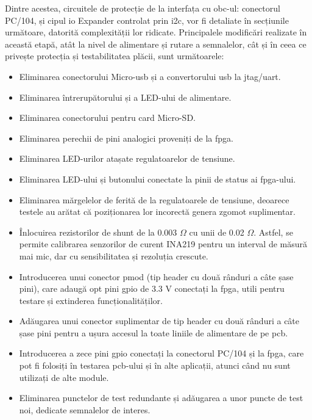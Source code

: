 \documentclass[12pt,a4paper]{report}
\begin{document}
Dintre acestea, circuitele de protecție de la interfața cu \gls{obc}-ul: conectorul PC/104, și cipul \gls{io} Expander controlat prin \gls{i2c}, vor fi detaliate în secțiunile următoare, datorită complexității lor ridicate. Principalele modificări realizate în această etapă, atât la nivel de alimentare și rutare a semnalelor, cât și în ceea ce privește protecția și testabilitatea plăcii, sunt următoarele:
\begin{itemize}\setlength\itemsep{0.2em}
    \item Eliminarea conectorului Micro-\gls{usb} și a convertorului \gls{usb} la \gls{jtag}/\gls{uart}.
    \item Eliminarea întrerupătorului și a LED-ului de alimentare.
    \item Eliminarea conectorului pentru card Micro-SD.
    \item Eliminarea perechii de pini analogici proveniți de la \gls{fpga}.
    \item Eliminarea LED-urilor atașate regulatoarelor de tensiune.
    \item Eliminarea LED-ului și butonului conectate la pinii de status ai \gls{fpga}-ului. 
    \item Eliminarea mărgelelor de ferită de la regulatoarele de tensiune, deoarece testele au arătat că poziționarea lor incorectă genera zgomot suplimentar.
    \item Înlocuirea rezistorilor de shunt de la 0.003 \(\Omega\) cu unii de 0.02 \(\Omega\). Astfel, se permite calibrarea senzorilor de curent INA219 pentru un interval de măsură mai mic, dar cu sensibilitatea și rezoluția crescute.
    \item Introducerea unui conector \gls{pmod} (tip header cu două rânduri a câte șase pini), care adaugă opt pini \gls{gpio} de 3.3 V conectați la \gls{fpga}, utili pentru testare și extinderea funcționalităților.
    \item Adăugarea unui conector suplimentar de tip header cu două rânduri a câte șase pini pentru a ușura accesul la toate liniile de alimentare de pe \gls{pcb}.
    \item Introducerea a zece pini \gls{gpio} conectați la conectorul PC/104 și la \gls{fpga}, care pot fi folosiți în testarea \gls{pcb}-ului și în alte aplicații, atunci când nu sunt utilizați de alte module.
    \item Eliminarea punctelor de test redundante și adăugarea a unor puncte de test noi, dedicate semnalelor de interes.
\end{itemize}
\end{document}

